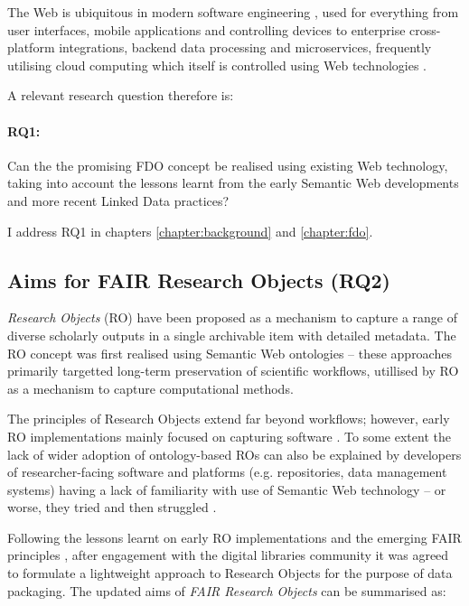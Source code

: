 
The Web is ubiquitous in modern software engineering \cite{Taivalsaari 2021}, used for everything from user interfaces, mobile applications and controlling devices to enterprise cross-platform integrations, backend data processing and microservices, frequently utilising cloud computing which itself is controlled using Web technologies \cite{Marinescu 2023}.

A relevant research question therefore is: 

\paragraph{RQ1:}\label{rq1} 
Can the the promising FDO concept be realised using existing Web technology, taking into account the lessons learnt from the early Semantic Web developments and more recent Linked Data practices?

I address RQ1 in chapters \ref{chapter:background} and \ref{chapter:fdo}.


\subsection{Aims for FAIR Research Objects (RQ2)}
\label{intro:rq2}

\emph{Research Objects} (RO) \cite{Bechhofer 2013} have been proposed as a mechanism to capture a range of diverse scholarly outputs in a single archivable item with detailed metadata. The RO concept was first realised using Semantic Web ontologies \cite{myExperiment 2009,Belhajjame 2015} -- these approaches primarily targetted long-term preservation of scientific workflows, utillised by RO as a mechanism to capture computational methods.

The principles of Research Objects extend far beyond workflows; however, early RO implementations mainly focused on capturing software \cite{Goble 2018}. To some extent the lack of wider adoption of ontology-based ROs can also be explained by developers of researcher-facing software and platforms (e.g. repositories, data management systems) having a lack of familiarity with use of Semantic Web technology -- or worse, they tried and then struggled \cite{Carriero 2010,Tudorache 2020}.

Following the lessons learnt on early RO implementations and the emerging FAIR principles \cite{Wilkinson 2016,Jacobsen 2020}, after engagement with the digital libraries community it was agreed to formulate a lightweight approach to Research Objects \cite{Sefton 2018,Ó Carragáin 2019b} for the purpose of data packaging. The updated aims of \emph{FAIR Research Objects} can be summarised as:
 
